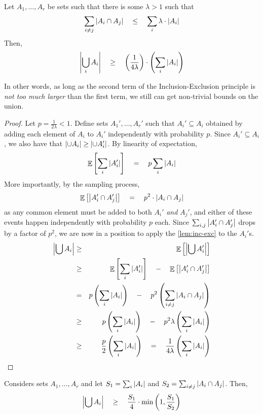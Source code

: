 \begin{lemma}\label{lem:str-inc-exc}
Let $A_1,\dots, A_r$ be sets such that there is some $\lambda > 1$ such that
\[
\sum_{i\neq j} \left|A_i \cap A_j\right| \quad \leq \quad \sum_i \lambda \cdot \left|A_i\right|
\]
Then, 
\[
\left|\bigcup_i A_i\right| \quad \geq \quad \left(\frac{1}{4\lambda}\right) \cdot \left(\sum_i \left|A_i\right|\right)
\]
\end{lemma}

In other words, as long as the second term of the Inclusion-Exclusion principle is \emph{not too much larger} than the first term, we still can get non-trivial bounds on the union. 

\begin{proof}
Let $p = \frac{1}{2\lambda} < 1$. 
Define sets $A_1',\dots, A_r'$ such that $A_i' \subseteq A_i$ obtained by adding each element of $A_i$ to $A_i'$ independently with probability $p$. 
Since $A_i' \subseteq A_i$, we also have that $\left|\cup A_i\right| \geq \left|\cup  A_i'\right|$. 
By linearity of expectation, 
\[
\mathop{\mathbb{E}}\left[\sum_i \left|A_i'\right|\right] \quad = \quad p \sum_{i} \left|A_i\right| 
\]
More importantly, by the sampling process,
\[
\mathop{\mathbb{E}}\left[\left|A_i' \cap A_j'\right|\right] \quad = \quad p^2 \cdot \left|A_i \cap A_j\right|
\]
as any common element must be added to both $A_i'$ \emph{and} $A_j'$, and either of these events happen independently with probability $p$ each. 
Since $\sum_{i,j}\left|A_i' \cap A_j'\right|$ drops by a factor of $p^2$, we are now in a position to apply the \autoref{lem:inc-exc} to the $A_i'$s. 
\begin{eqnarray*}
\left|\bigcup A_i\right| & \geq &  \mathop{\mathbb{E}}\left[\left|\bigcup A_i'\right|\right]\\
& \geq & \mathop{\mathbb{E}}\left[\sum_i \left|A_i'\right|\right] \quad - \quad \mathop{\mathbb{E}}\left[\left|A_i' \cap A_j'\right|\right]\\
& = & p \left(\sum_i \left|A_i\right|\right) \quad - \quad p^2\left(\sum_{i\neq j}\left|A_i \cap A_j\right|\right)\\
& \geq & p \left(\sum_i \left|A_i\right|\right) \quad - \quad p^2 \lambda \left(\sum_i \left|A_i\right|\right)\\
& \geq & \frac{p}{2} \left(\sum_i \left|A_i\right|\right) \quad = \quad \frac{1}{4\lambda} \left(\sum_i \left|A_i\right|\right)
\end{eqnarray*}
\end{proof}

\begin{corollary}\label{cor:inc-exc-str}
Considers sets $A_1,\dots, A_r$  and let $S_1 = \sum_i \left|A_i\right|$ and $S_2 = \sum_{i\neq j} \left|A_i \cap A_j\right|$. 
Then, 
\[
\left|\bigcup A_i\right| \quad \geq \quad \frac{S_1}{4} \cdot \min\left(1,\frac{S_1}{S_2}\right)
\]
\end{corollary}

